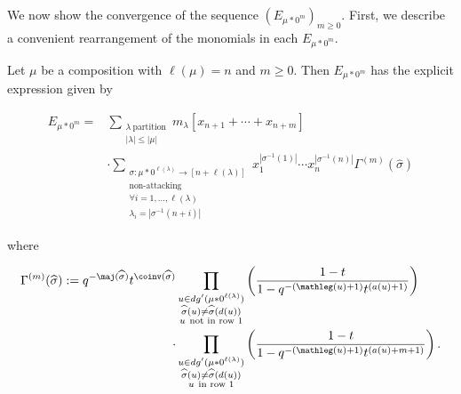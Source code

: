 We now show the convergence of the sequence $(E_{\mu*0^m})_{m \geq 0}$. First, we describe a convenient rearrangement of the monomials in each $E_{\mu*0^m}$.

\begin{thm} \label{HHL tail expansion}

Let $\mu$ be a composition with $\ell(\mu) = n$ and $m \geq 0$. Then $E_{\mu * 0^m}$ has the explicit expression given by 

\begin{align}\label{finite variable expansion eq}
    E_{\mu * 0^m} = {} & {} \sum_{\substack{\lambda ~ \text{partition}  \\ |\lambda| \leq |\mu|}} m_{\lambda}[x_{n+1}+\cdots + x_{n+m}] \\ \nonumber & \cdot \sum_{\substack{\sigma:\mu * 0^{\ell(\lambda)}  \rightarrow [n+\ell(\lambda)]\\ \text{non-attacking} \\ \forall i = 1,\ldots,\ell(\lambda) \\ \lambda_i = |\sigma^{-1}(n+i)|}} x_1 ^{|\sigma^{-1}(1)|}\cdots x_n ^{|\sigma^{-1}(n)|} \Gamma^{(m)} (\widehat{\sigma})
\end{align}

where 

\begin{equation*}
\begin{split}
     \Gamma^{(m)}(\widehat{\sigma}) :=
       q^{-\maj(\widehat{\sigma})}t^{\coinv(\widehat{\sigma})} & \prod_{\substack{ u \in dg'(\mu * 0^{\ell(\lambda)}) \\ \widehat{\sigma}(u) \neq \widehat{\sigma}(d(u)) \\ u ~ \text{not in row } 1 }} \left( \frac{1-t}{1-q^{-(\mathleg(u)+1)}t^{(a(u)+1)}} \right) \\ \cdot & \prod_{\substack{ u \in dg'(\mu * 0^{\ell(\lambda)}) \\ \widehat{\sigma}(u) \neq \widehat{\sigma}(d(u)) \\ u ~ \text{in row } 1 }} \left( \frac{1-t}{1-q^{-(\mathleg(u) +1)}t^{(a(u) + m + 1)}} \right).
\end{split}
\end{equation*}

 
 \end{thm}
 
